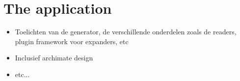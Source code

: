 \section{The application} \label{sec:artifact_application}

\begin{itemize}
    \item Toelichten van de generator, de verschillende onderdelen zoals de readers,
    plugin framework voor expanders, etc
    \item Inclusief archimate design
    \item etc...
\end{itemize}